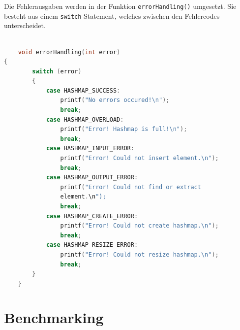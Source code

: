 \documentclass[11pt,a4paper]{article}
\begin{document}
Die Fehlerausgaben werden in der Funktion \lstinline{errorHandling()} umgesetzt. Sie besteht aus einem \lstinline{switch}-Statement, welches zwischen den 
Fehlercodes unterscheidet.

\begin{lstlisting}[language=C]
    
    void errorHandling(int error)
{
        switch (error)
        {
            case HASHMAP_SUCCESS: 
                printf("No errors occured!\n");
                break;
            case HASHMAP_OVERLOAD:
                printf("Error! Hashmap is full!\n"); 
                break;     
            case HASHMAP_INPUT_ERROR:  
                printf("Error! Could not insert element.\n"); 
                break;
            case HASHMAP_OUTPUT_ERROR: 
                printf("Error! Could not find or extract 
                element.\n");
                break;
            case HASHMAP_CREATE_ERROR:
                printf("Error! Could not create hashmap.\n");
                break;
            case HASHMAP_RESIZE_ERROR: 
                printf("Error! Could not resize hashmap.\n");
                break;
        }
    }

\end{lstlisting}

\section{Benchmarking}
\end{document}
